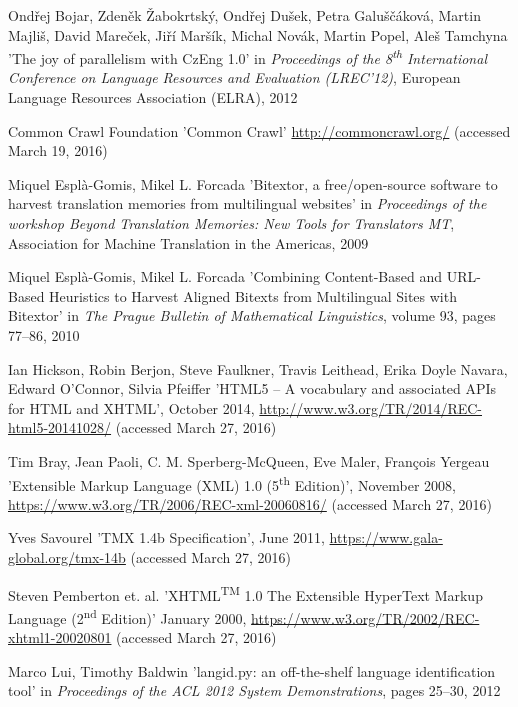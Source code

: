 \begin{thebibliography}{99}
Ondřej Bojar, Zdeněk Žabokrtský, Ondřej Dušek, Petra Galuščáková, Martin Majliš, David Mareček, Jiří Maršík, Michal Novák, Martin Popel, Aleš Tamchyna
'The joy of parallelism with CzEng 1.0'
in \textit{Proceedings of the 8\textsuperscript{th} International Conference on Language Resources and Evaluation (LREC'12)},
European Language Resources Association (ELRA), 2012

Common Crawl Foundation
'Common Crawl'
\url{http://commoncrawl.org/} (accessed March 19, 2016)

Miquel Esplà-Gomis, Mikel L. Forcada
'Bitextor, a free/open-source software to harvest translation memories from multilingual websites'
in \textit{Proceedings of the workshop {B}eyond {T}ranslation {M}emories: New Tools for Translators {MT}},
Association for Machine Translation in the Americas, 2009

Miquel Esplà-Gomis, Mikel L. Forcada
'Combining Content-Based and URL-Based Heuristics to Harvest Aligned Bitexts from Multilingual Sites with Bitextor'
in \textit{The Prague Bulletin of Mathematical Linguistics},
volume 93,
pages 77--86,
2010

Ian Hickson, Robin Berjon, Steve Faulkner, Travis Leithead, Erika Doyle Navara, Edward O'Connor, Silvia Pfeiffer
'HTML5 -- A vocabulary and associated APIs for HTML and XHTML',
October 2014,
\url{http://www.w3.org/TR/2014/REC-html5-20141028/} (accessed March 27, 2016)

Tim Bray, Jean Paoli, C. M. Sperberg-McQueen, Eve Maler, François Yergeau
'Extensible Markup Language (XML) 1.0 (5\textsuperscript{th} Edition)', 
November 2008,
\url{https://www.w3.org/TR/2006/REC-xml-20060816/} (accessed March 27, 2016)

Yves Savourel
'TMX 1.4b Specification',
June 2011,
\url{https://www.gala-global.org/tmx-14b} (accessed March 27, 2016)

Steven Pemberton et. al.
'XHTML\textsuperscript{TM} 1.0 The Extensible HyperText Markup Language (2\textsuperscript{nd} Edition)'
January 2000,
\url{https://www.w3.org/TR/2002/REC-xhtml1-20020801} (accessed March 27, 2016)

Marco Lui, 	Timothy Baldwin
'langid.py: an off-the-shelf language identification tool'
in \textit{Proceedings of the ACL 2012 System Demonstrations},
pages 25--30,
2012


\end{thebibliography}
